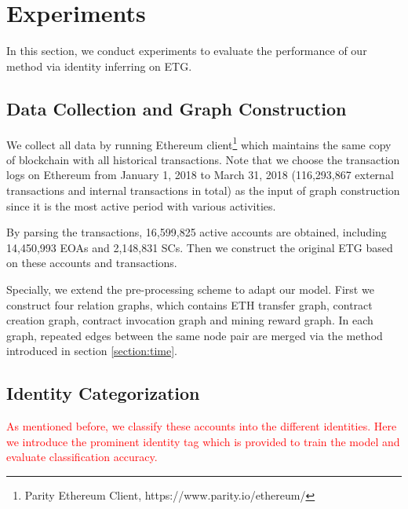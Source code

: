 
\section{Experiments}
\label{sec:experiments}
In this section, we conduct experiments to evaluate the performance of our method via identity inferring on ETG.

\subsection{Data Collection and Graph Construction}
We collect all data by running Ethereum client\footnote{Parity Ethereum Client, https://www.parity.io/ethereum/} which maintains the same copy of blockchain with all historical transactions. Note that we choose the transaction logs on Ethereum from January 1, 2018 to March 31, 2018 (116,293,867 external transactions and internal transactions in total) as the input of graph construction since it is the most active period with various activities.

By parsing the transactions, 16,599,825 active accounts are obtained, including 14,450,993 EOAs and 2,148,831 SCs. Then we construct the original ETG based on these accounts and transactions.

Specially, we extend the pre-processing scheme to adapt our model. First we construct four relation graphs, which contains ETH transfer graph, contract creation graph, contract invocation graph and mining reward graph. In each graph, repeated edges between the same node pair are merged via the method introduced in section \ref{section:time}.


\subsection{Identity Categorization}
\textcolor{red}{As mentioned before, we classify these accounts into the different identities. Here we introduce the prominent identity tag which is provided to train the model and evaluate classification accuracy.}

